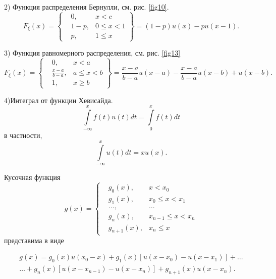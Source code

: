 \begin{example}
2) Функция распределения Бернулли, см. рис. \ref{fig10}.
\begin{equation*}
F_{\xi}(x) = 
  \left\{
 \begin{aligned}
   &0,&x<c\\
   &1-p,&0\leqslant x<1\\
   &p,&1\leqslant x
 \end{aligned}\right\}
 =(1-p)u(x)-pu(x-1).
\end{equation*}

3) Функция равномерного распределения, см. рис. \ref{fig13}
\begin{equation*}
F_{\xi}(x) = 
 \left\{\begin{aligned}
   &0,	&x<a\\
   &\frac{x-a}{b-a},	&a\leqslant x<b\\
   &1,	&x\geqslant b
 \end{aligned}\right\}
 =
 \frac{x-a}{b-a}u(x-a)-\frac{x-a}{b-a}u(x-b)+u(x-b).
\end{equation*}

4)Интеграл от функции Хевисайда.
\begin{equation*}
	\int\limits_{-\infty}^x f(t)u(t)dt=\int\limits_0^xf(t)dt
\end{equation*}
в частности,
\begin{equation*}
	\int\limits_{-\infty}^x u(t)dt=xu(x).
\end{equation*}

\end{example}

\begin{lemma}
\label{lemma:13.3}
	Кусочная функция
\begin{equation*}
	g(x)=
	\left\{\begin{aligned}
		&g_0(x),	&x<x_0 \\
		&g_1(x), 	&x_0\leqslant x<x_1\\
		&\ldots,	&\ldots\\
		&g_n(x),	&x_{n-1}\leqslant x<x_n\\
		&g_{n+1}(x), &x_n\leqslant x
 	\end{aligned}\right.
\end{equation*}
	представима в виде

\begin{gather*}
g(x)=g_0(x)u(x_0-x)+g_1(x)[u(x-x_0)-u(x-x_1)]+\ldots \\
\ldots+g_n(x)[u(x-x_{n-1})-u(x-x_n)]+g_{n+1}(x)u(x-x_n).
\end{gather*}
\end{lemma}

